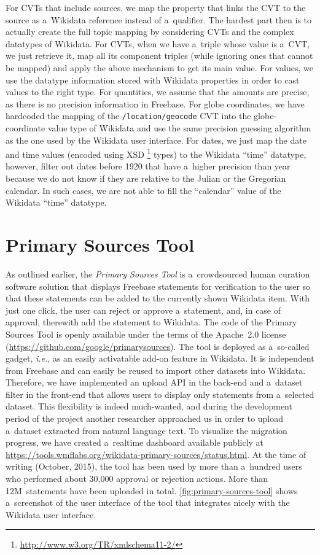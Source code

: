 \documentclass{sig-alternate}
\begin{document}
For CVTs that include sources, we map the property that links the CVT
to the source as a~Wikidata reference instead of a~qualifier.
The hardest part then is to actually create the full topic mapping
by considering CVTs and the complex datatypes of Wikidata.
For CVTs, when we have a~triple whose value is a~CVT, we just retrieve it,
map all its component triples (while ignoring ones that cannot be mapped)
and apply the above mechanism to get its main value.
For values, we use the datatype information stored with Wikidata properties
in order to cast values to the right type.
For quantities, we assume that the amounts are precise,
as there is no precision information in Freebase.
For globe coordinates, we have hardcoded the mapping of the \texttt{/location/geocode} CVT
into the globe-coordinate value type of Wikidata
and use the same precision guessing algorithm as the one used by the Wikidata user interface.
For dates, we just map the date and time values (encoded using XSD%
\footnote{\url{ http://www.w3.org/TR/xmlschema11-2/}} types)
to the Wikidata ``time'' datatype, however, filter out dates before 1920 that have
a~higher precision than year because we do not know
if they are relative to the Julian or the Gregorian calendar.
In such cases, we are not able to fill the ``calendar'' value of the Wikidata ``time'' datatype.

\section{Primary Sources Tool}\label{sec:primary-sources-tool}

As outlined earlier, the \emph{Primary Sources Tool} is a~crowdsourced human curation
software solution that displays Freebase statements for verification to the user
so that these statements can be added to the currently shown Wikidata item.
With just one click, the user can reject or approve a~statement,
and, in case of approval, therewith add the statement to Wikidata.
The code of the Primary Sources Tool is openly available
under the terms of the Apache~2.0 license (\url{https://github.com/google/primarysources}).
The tool is deployed as a~so-called gadget,
\emph{i.e.}, as an easily activatable add-on feature in Wikidata.
It is independent from Freebase and can easily be reused to import other datasets into Wikidata.
Therefore, we have implemented an upload API in the back-end
and a~dataset filter in the front-end that allows users
to display only statements from a~selected dataset.
This flexibility is indeed much-wanted, and during the development period of the project
another researcher approached us in order to upload a~dataset extracted from natural language text.
To visualize the migration progress, we have created a~realtime dashboard
available publicly at \url{https://tools.wmflabs.org/wikidata-primary-sources/status.html}.
At the time of writing (October, 2015), the tool has been used by more than a~hundred users
who performed about 30,000 approval or rejection actions.
More than 12M~statements have been uploaded in total.
\autoref{fig:primary-sources-tool} shows a~screenshot of the user interface
of the tool that integrates nicely with the Wikidata user interface.
\end{document}
